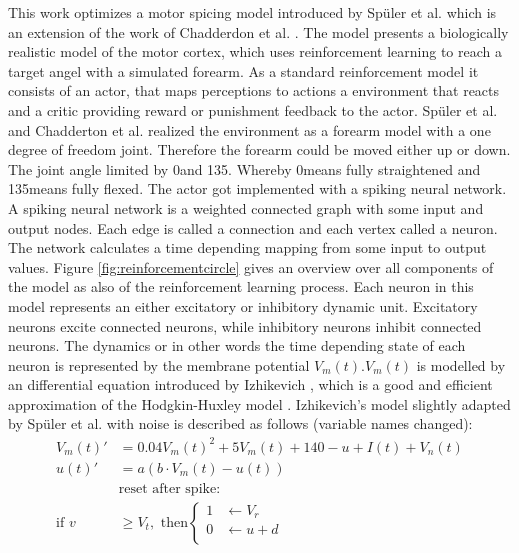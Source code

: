This work optimizes a motor spicing model introduced by Spüler et al. \cite{sebastianPaper}\cite{sebastianPaper} which is an extension of the work of Chadderdon et al. \cite{chadderdonNeuronalModel}. The model presents a biologically realistic model of the motor cortex, which uses reinforcement learning to reach a target angel with a simulated forearm.
As a standard reinforcement model \cite{reinforcementlearning}\cite{chadderdonNeuronalModel} it consists of an actor, that maps perceptions to actions a environment that reacts and a critic providing reward or punishment feedback to the actor. Spüler et al. and Chadderton et al. realized the environment as a forearm model with a one degree of freedom joint. Therefore the forearm could be moved either up or down. The joint angle limited by 0\degree and 135\degree. Whereby 0\degree means fully straightened and 135\degree means fully flexed. The actor got implemented with a spiking neural network. A spiking neural network is a weighted connected graph with some input and output nodes. Each edge is called a connection and each vertex called a neuron. The network calculates a time depending mapping from some input to output values.
Figure \ref{fig:reinforcementcircle} gives an overview over all components of the model as also of the reinforcement learning process.
Each neuron in this model represents an either excitatory or inhibitory dynamic unit. Excitatory neurons excite connected neurons, while inhibitory neurons inhibit connected neurons.
The dynamics or in other words the time depending state of each neuron is represented by the membrane potential $V_m(t)$.$V_m(t)$ is modelled by an differential equation introduced by Izhikevich \cite{izhikevichSimpleModel}, which is a good and efficient approximation of the Hodgkin-Huxley model \cite{hodgkinHuxleyModel}. Izhikevich's model slightly adapted by Spüler et al. with noise is described as follows (variable names changed):
\begin{align*}
	V_m(t)' &= 0.04 V_m(t)^2+5V_m(t)+140-u+I(t)+V_n(t)\\
	u(t)' &= a(b\cdot V_m(t)-u(t))\\
	&\text{reset after spike:}\\
	\text{if } v&\geq V_t,\text{ then}
	\begin{cases}
	1 & \leftarrow V_r\\
	0 & \leftarrow u+d\\
	\end{cases} 
\end{align*}

